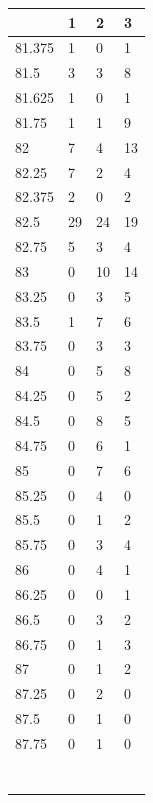 \begin{table}[H]
\begin{tabular}{llll}
	\end{tabular}
	\begin{tabular}{llll}
		& 1  & 2  & 3  \\
		\hline
		81.375 & 1  & 0  & 1  \\
		81.5   & 3  & 3  & 8  \\
		81.625 & 1  & 0  & 1  \\
		81.75  & 1  & 1  & 9  \\
		82     & 7  & 4  & 13 \\
		82.25  & 7  & 2  & 4  \\
		82.375 & 2  & 0  & 2  \\
		82.5   & 29 & 24 & 19 \\
		82.75  & 5  & 3  & 4  \\
		83     & 0  & 10 & 14 \\
		83.25  & 0  & 3  & 5  \\
		83.5   & 1  & 7  & 6  \\
		83.75  & 0  & 3  & 3  \\
		84     & 0  & 5  & 8  \\
		84.25  & 0  & 5  & 2  \\
		84.5   & 0  & 8  & 5  \\
		84.75  & 0  & 6  & 1  \\
		85     & 0  & 7  & 6  \\
		85.25  & 0  & 4  & 0  \\
		85.5   & 0  & 1  & 2  \\
		85.75  & 0  & 3  & 4  \\
		86     & 0  & 4  & 1  \\
		86.25  & 0  & 0  & 1  \\
		86.5   & 0  & 3  & 2  \\
		86.75  & 0  & 1  & 3  \\
		87     & 0  & 1  & 2  \\
		87.25  & 0  & 2  & 0  \\
		87.5   & 0  & 1  & 0  \\
		87.75  & 0  & 1  & 0 \\
		&&&  \\
		&&&  \\
		&&&  \\
		&&&  \\
		&&&  \\
		&&&  \\
		&&&  
	\end{tabular}
	
\end{table}

